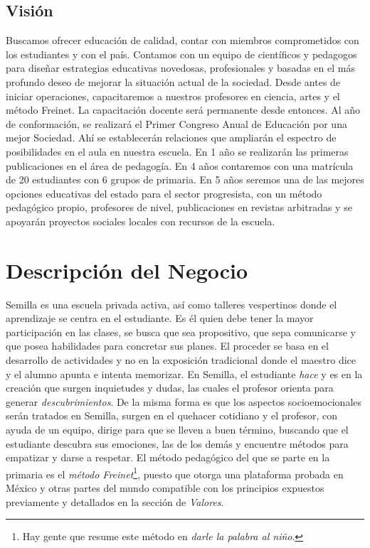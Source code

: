 \documentclass[10pt,letterpaper,oneside]{book}
\begin{document}
\subsection*{Visión}
Buscamos ofrecer educación de calidad, contar con miembros comprometidos con los estudiantes y con el país. Contamos con un equipo de científicos y pedagogos para diseñar estrategias educativas novedosas, profesionales y basadas en el más profundo deseo de mejorar la situación actual de la sociedad. Desde antes de iniciar operaciones, capacitaremos a nuestros profesores en ciencia, artes y el método Freinet. La capacitación docente será permanente desde entonces. Al año de conformación, se realizará el Primer Congreso Anual de Educación por una mejor Sociedad. Ahí se establecerán relaciones que ampliarán el espectro de posibilidades en el aula en nuestra escuela. En 1 año se realizarán las primeras publicaciones en el área de pedagogía. En 4 años contaremos con una matrícula de 20 estudiantes con 6 grupos de primaria. En 5 años seremos una de las mejores opciones educativas del estado para el sector progresista, con un método pedagógico propio, profesores de nivel, publicaciones en revistas arbitradas y se apoyarán proyectos sociales locales con recursos de la escuela.

\section{Descripción del Negocio}

Semilla es una escuela privada activa, así como talleres vespertinos donde el aprendizaje se centra en el estudiante. Es él quien debe tener la mayor participación en las clases, se busca que sea propositivo, que sepa comunicarse y que posea habilidades para concretar sus planes. El proceder se basa en el desarrollo de actividades y no en la exposición tradicional donde el maestro dice y el alumno apunta e intenta memorizar. En Semilla, el estudiante \emph{hace} y es en la creación que surgen inquietudes y dudas, las cuales el profesor orienta para generar \emph{descubrimientos}. De la misma forma es que los aspectos socioemocionales serán tratados en Semilla, surgen en el quehacer cotidiano y el profesor, con ayuda de un equipo, dirige para que se lleven a buen término, buscando que el estudiante descubra sus emociones, las de los demás y encuentre métodos para empatizar y darse a respetar. El método pedagógico del que se parte en la primaria es el \emph{método Freinet}\footnote{Hay gente que resume este método en \emph{darle la palabra al niño}.}, puesto que otorga una plataforma probada en México y otras partes del mundo compatible con los principios expuestos previamente y detallados en la sección de \emph{Valores}.
\end{document}
